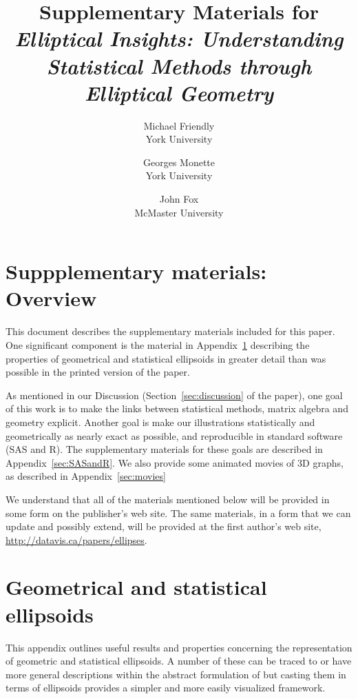 \documentclass[11pt]{article}%
\newcommand*{\secref}[1]{Section~\ref{#1}}
\newcommand*{\appref}[1]{Appendix~\ref{#1}}
\begin{document}
\begin{titlepage}
\title{Supplementary Materials for \emph{Elliptical Insights: Understanding Statistical Methods through Elliptical Geometry}}
\author{Michael Friendly%
 \\ York University
\and
Georges Monette \\ York University
\and
John Fox \\ McMaster University
}
\end{titlepage}
\maketitle

\section*{Suppplementary materials: Overview}

This document describes the supplementary materials included for this paper.  One significant component
is the material in  \appref{sec:Appendix}  describing the properties of geometrical and statistical
ellipsoids in greater detail than was possible in the printed version of the paper.

As mentioned in our Discussion
(\secref{sec:discussion} of the paper), one goal of this work is to make the links between statistical methods, matrix algebra
and geometry explicit. Another goal is make our illustrations statistically and geometrically 
as nearly exact as possible, and reproducible in standard software (SAS and R).  The supplementary materials
for these goals are described in \appref{sec:SASandR}.  We also provide some animated movies of 3D
graphs, as described in \appref{sec:movies}

We understand that all of the materials mentioned below will be provided in some form on the publisher's
web site.  The same materials, in a form that we can update and possibly extend, will be provided
at the first author's web site, \url{http://datavis.ca/papers/ellipses}. 

\appendix
{}
\section{Geometrical and statistical ellipsoids}\label{sec:Appendix}
This appendix outlines useful results and properties concerning the representation of geometric and statistical ellipsoids.
A number of these can be traced to or have more general descriptions within the abstract formulation of \citet{Dempster:69}
but casting them in terms of ellipsoids provides a simpler and more easily visualized framework. 




\end{document}
